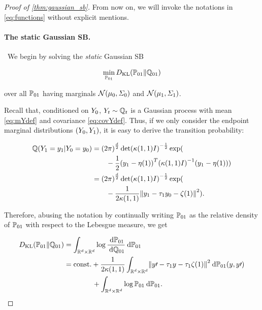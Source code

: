 \begin{proof}[Proof of \cref{thm:gaussian_sb}]
From now on, we will invoke the notations in \eqref{eq:functions} without explicit mentions.

\paragraph{The static Gaussian SB.}
~We begin by solving the \emph{static} Gaussian \acrshort{SB}

\begin{align}
\label{eq:staticGSB}
\min_{ \Psta}\KL(\Psta \| \Qsta)
\end{align}

over all $\Psta$ having marginals $\Ncal\parens*{  \m, \covar }$ and $\Ncal\parens*{  \malt, \covaralt }$.

Recall that, conditioned on $\refsde[0]$, $\refsde \sim \refpro$ is a Gaussian process with mean \eqref{eq:mYdef} and covariance \eqref{eq:covYdef}. Thus, if we only consider the endpoint marginal distributions $(\refsde[0], \refsde[\horizon])$, it is easy to derive the transition probability:

\begin{align}
\refprobase\parens*{   \refsde[\horizon] = y_\horizon \middle| \refsde[0] = y_0 } &= \Nconst  \det \parens*{\kernel[\horizon][\horizon] \eye }^{-\frac{1}{2}} \exp(  \\
\nn & \qquad-\frac{1}{2}  \parens*{y_\horizon - \mYcinit[\horizon]}^T   \parens*{\kernel[\horizon][\horizon] \eye }^{-1}\parens*{y_\horizon - \mYcinit[\horizon]} ) \\
&= \Nconst  \det \parens*{\kernel[\horizon][\horizon] \eye }^{-\frac{1}{2}} \exp( \\ 
\nn & \qquad-\frac{1}{2\kernel[\horizon][\horizon]}  \norm*{  y_\horizon - \aggtime[\horizon] y_0  - \tshift[\horizon]   }^2).
\end{align}

Therefore, abusing the notation by continually writing $\Psta$ as the relative density of $\Psta$ with respect to the Lebesgue measure, we get

\begin{align}
\label{eq:KLsta}
\KL(\Psta \| \Qsta) &= \int_{\R^\vdim \times \R^\vdim}  \log \frac{\dd \Psta } {\dd \Qsta} \dd \Psta \\
\label{eq:hold}
&=   \const +  \frac{1}{2 \kernel[\horizon][\horizon]} \int_{\R^\vdim \times \R^\vdim}  \norm*{  y\prime - \aggtime[\horizon] y   - \aggtime[\horizon]\tshift[\horizon]    }^2  \dd \Psta(y,y\prime) \\
\nn &\qquad\qquad+  \intRR \log  \Psta  \dd \Psta.
\end{align}


\end{proof}
